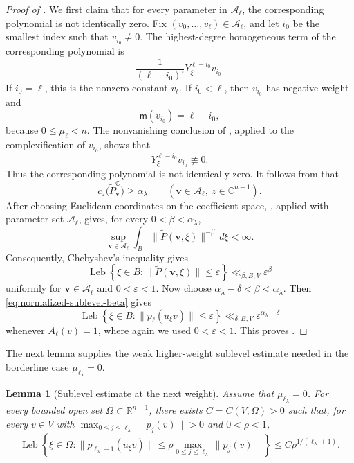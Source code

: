 \documentclass[reqno,11pt]{amsart}
\numberwithin{equation}{section}
\newtheorem{lemma}[theorem]{Lemma}
\theoremstyle{definition}
\theoremstyle{remark}
\newcommand{\op}{\operatorname}
\newcommand{\e}{\varepsilon}
\newcommand{\Leb}{\op{Leb}}
\begin{document}
\begin{proof}[Proof of ]
We first claim that for every parameter in $\mathcal A_\ell$,
the corresponding polynomial 
 is not identically zero. Fix
$(v_0,\ldots,v_\ell)\in\mathcal A_\ell$, and let $i_0$ be the
smallest index such that $v_{i_0}\ne0$. The highest-degree homogeneous
term of the corresponding polynomial is
$$
\frac{1}{(\ell-i_0)!}Y_\xi^{\ell-i_0}v_{i_0}.
$$
If $i_0=\ell$, this is the nonzero constant $v_\ell$. If
$i_0<\ell$, then $v_{i_0}$ has negative weight and
$$
\mathsf m(v_{i_0})=\ell-i_0,
$$
because $0\le\mu_\ell<n$. The nonvanishing conclusion of
, applied to the complexification of
$v_{i_0}$, shows that
$$
Y_\xi^{\ell-i_0}v_{i_0}\not\equiv0.
$$
Thus the corresponding polynomial is not identically zero. It follows from  that
$$
c_z\bigl(\widetilde P_{\boldsymbol v}^{\mathbb C}\bigr)
\ge\alpha_\lambda
\qquad
(\boldsymbol v\in\mathcal A_\ell,\ z\in\mathbb C^{n-1}).
$$
After choosing Euclidean coordinates on the coefficient space,
, applied with parameter set
$\mathcal A_\ell$, gives, for every $0<\beta<\alpha_\lambda$,
\begin{equation}\label{eq:uniform-negative-moment-P}
\sup_{\boldsymbol v\in\mathcal A_\ell}
\int_B
\|\widetilde P(\boldsymbol v,\xi)\|^{-\beta}\,d\xi
<\infty.
\end{equation}
Consequently, Chebyshev's inequality gives
\begin{equation}\label{eq:normalized-sublevel-beta}
\operatorname{Leb}
\left\{
\xi\in B:
\|\widetilde P(\boldsymbol v,\xi)\|\le\varepsilon
\right\}
\ll_{\beta,B,V}\varepsilon^\beta
\end{equation}
uniformly for $\boldsymbol v\in\mathcal A_\ell$ and
$0<\varepsilon<1$.
Now choose
$
\alpha_\lambda-\delta<\beta<\alpha_\lambda.
$
Then \eqref{eq:normalized-sublevel-beta} gives
$$
\operatorname{Leb}
\left\{
\xi\in B:
\|p_\ell(u_\xi v)\|\le\varepsilon
\right\}
\ll_{\delta,B,V}
\varepsilon^{\alpha_\lambda-\delta}
$$
whenever $A_\ell(v)=1$, where again we used $0<\e<1$. This proves .
\end{proof}

The next lemma supplies the weak higher-weight sublevel estimate needed in the
borderline case $\mu_{\ell_{\lambda}}=0$.
\begin{lemma}[Sublevel estimate at the next weight]
\label{lem:next-weight-sublevel}
Assume that $\mu_{\ell_\lambda}=0$. For every
bounded open set $\Omega\subset\mathbb R^{n-1}$, there exists
$C=C(V,\Omega)>0$ such that, for every $v\in V$ with
$\max_{0\le j\le\ell_\lambda}\|p_j(v)\|>0$ and $0<\rho<1$,
$$
\Leb\left\{\xi\in\Omega:
 \|p_{\ell_{\lambda}+1}(u_\xi v)\|
 \le \rho\max_{0\le j\le\ell_\lambda}\|p_j(v)\|
\right\}
\le C\rho^{1/(\ell_{\lambda}+1)}.
$$
\end{lemma}
\end{document}
